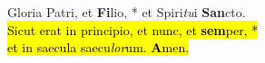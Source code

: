 Gloria Patri, et \textbf{Fi}lio, * et Spiri\emph{tu}i \textbf{San}cto. \\
\hl{Sicut erat in principio, et nunc, et \textbf{sem}per, *\\
et in saecula saecu\emph{lor}um. \textbf{A}men.}
